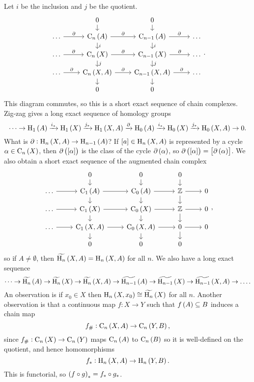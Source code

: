 Let $ i $ be the inclusion and $ j $ be the quotient.
$$
\begin{tikzcd}[row sep=small]
& 0 \arrow{d} & 0 \arrow{d} & \\
\dots \arrow{r}{\da} & \C_n\br{A} \arrow{r}{\da} \arrow{d}{i} & \C_{n - 1}\br{A} \arrow{r}{\da} \arrow{d}{i} & \dots \\
\dots \arrow{r}{\da} & \C_n\br{X} \arrow{r}{\da} \arrow{d}{j} & \C_{n - 1}\br{X} \arrow{r}{\da} \arrow{d}{j} & \dots \\
\dots \arrow{r}{\da} & \C_n\br{X, A} \arrow{r}{\da} \arrow{d} & \C_{n - 1}\br{X, A} \arrow{r}{\da} \arrow{d} & \dots \\
& 0 & 0 &
\end{tikzcd}.
$$
This diagram commutes, so this is a short exact sequence of chain complexes. Zig-zag gives a long exact sequence of homology groups
$$ \dots \to \H_1\br{A} \xrightarrow{i_*} \H_1\br{X} \xrightarrow{j_*} \H_1\br{X, A} \xrightarrow{\da} \H_0\br{A} \xrightarrow{i_*} \H_0\br{X} \xrightarrow{j_*} \H_0\br{X, A} \to 0. $$
What is $ \da : \H_n\br{X, A} \to \H_{n - 1}\br{A} $? If $ \sbr{a} \in \H_n\br{X, A} $ is represented by a cycle $ \alpha \in \C_n\br{X} $, then $ \da\br{\sbr{\alpha}} $ is the class of the cycle $ \da\br{\alpha} $, so $ \da\br{\sbr{\alpha}} = \sbr{\da\br{\alpha}} $. We also obtain a short exact sequence of the augmented chain complex
$$
\begin{tikzcd}[row sep=small]
& 0 \arrow{d} & 0 \arrow{d} & 0 \arrow{d} & \\
\dots \arrow{r} & \C_1\br{A} \arrow{r} \arrow{d} & \C_0\br{A} \arrow{r} \arrow{d} & \ZZ \arrow{r} \arrow{d} & 0 \\
\dots \arrow{r} & \C_1\br{X} \arrow{r} \arrow{d} & \C_0\br{X} \arrow{r} \arrow{d} & \ZZ \arrow{r} \arrow{d} & 0 \\
\dots \arrow{r} & \C_1\br{X, A} \arrow{r} \arrow{d} & \C_0\br{X, A} \arrow{r} \arrow{d} & 0 \arrow{r} \arrow{d} & 0 \\
& 0 & 0 & 0 &
\end{tikzcd},
$$
so if $ A \ne \emptyset $, then $ \widetilde{\H_n}\br{X, A} = \H_n\br{X, A} $ for all $ n $. We also have a long exact sequence
$$ \dots \to \widetilde{\H_n}\br{A} \to \widetilde{\H_n}\br{X} \to \widetilde{\H_n}\br{X, A} \to \widetilde{\H_{n - 1}}\br{A} \to \widetilde{\H_{n - 1}}\br{X} \to \widetilde{\H_{n - 1}}\br{X, A} \to \dots. $$
An observation is if $ x_0 \in X $ then $ \H_n\br{X, x_0} \cong \widetilde{\H_n}\br{X} $ for all $ n $. Another observation is that a continuous map $ f : X \to Y $ such that $ f\br{A} \subseteq B $ induces a chain map
$$ f_\# : \C_n\br{X, A} \to \C_n\br{Y, B}, $$
since $ f_\# : \C_n\br{X} \to \C_n\br{Y} $ maps $ \C_n\br{A} $ to $ \C_n\br{B} $ so it is well-defined on the quotient, and hence homomorphisms
$$ f_* : \H_n\br{X, A} \to \H_n\br{Y, B}. $$
This is functorial, so $ \br{f \circ g}_* = f_* \circ g_* $.


